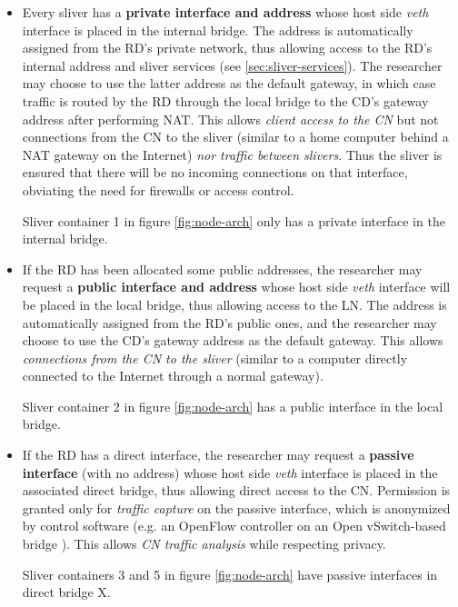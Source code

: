 \documentclass[conference]{IEEEtran}
\begin{document}
\begin{itemize}
\item Every sliver has a \textbf{private interface and address} whose host
  side \emph{veth} interface is placed in the internal bridge.  The address is
  automatically assigned from the RD's private network, thus allowing access
  to the RD's internal address and sliver services (see
  \ref{sec:sliver-services}).  The researcher may choose to use the latter
  address as the default gateway, in which case traffic is routed by the RD
  through the local bridge to the CD's gateway address after performing NAT.
  This allows \emph{client access to the CN} but not connections from the CN
  to the sliver (similar to a home computer behind a NAT gateway on the
  Internet) \emph{nor traffic between slivers}.  Thus the sliver is ensured
  that there will be no incoming connections on that interface, obviating the
  need for firewalls or access control.

  Sliver container 1 in figure \ref{fig:node-arch} only has a private
  interface in the internal bridge.

\item If the RD has been allocated some public addresses, the researcher may
  request a \textbf{public interface and address} whose host side \emph{veth}
  interface will be placed in the local bridge, thus allowing access to the
  LN.  The address is automatically assigned from the RD's public ones, and
  the researcher may choose to use the CD's gateway address as the default
  gateway.  This allows \emph{connections from the CN to the sliver} (similar
  to a computer directly connected to the Internet through a normal gateway).

  Sliver container 2 in figure \ref{fig:node-arch} has a public interface in
  the local bridge.

\item If the RD has a direct interface, the researcher may request a
  \textbf{passive interface} (with no address) whose host side \emph{veth}
  interface is placed in the associated direct bridge, thus allowing direct
  access to the CN.  Permission is granted only for \emph{traffic capture} on
  the passive interface, which is anonymized by control software (e.g. an
  OpenFlow controller \cite{openflow} on an Open vSwitch-based bridge
  \cite{open-vswitch}).  This allows \emph{CN traffic analysis} while
  respecting privacy.

  Sliver containers 3 and 5 in figure \ref{fig:node-arch} have passive
  interfaces in direct bridge X.


\end{itemize}
\end{document}
